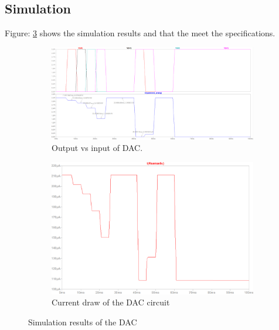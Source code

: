 \subsection{Simulation}
Figure: \ref{fig:dac_sim_res} shows the simulation results and that the meet the specifications. 
\begin{figure}[H]
\centering
\begin{subfigure}{0.3\textwidth}
\includegraphics[width = \linewidth]{./Figures/DAC_Sim_Out.png}
\caption{Output vs input of DAC.}
\label{subfig:dac_sim_out}
\end{subfigure}
\hfill
\begin{subfigure}{0.3\textwidth}
\centering
\includegraphics[width = \linewidth]{./Figures/DAC_Sim_Cur.png}
\caption{Current draw of the DAC circuit}
\label{subfig:dac_sim_cur}
\end{subfigure}
\caption{Simulation results of the DAC}
\label{fig:dac_sim_res}
\end{figure}

